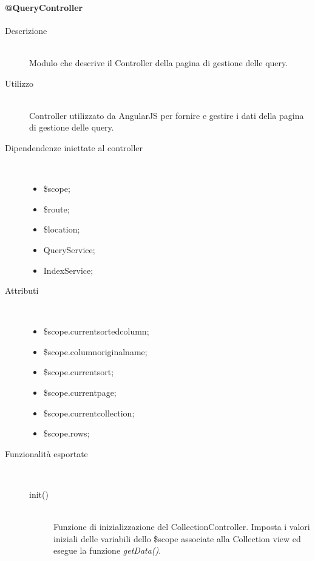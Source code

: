 \paragraph{@QueryController}
\begin{description}
 \item[Descrizione] \hfill \\
 Modulo che descrive il Controller della pagina di gestione delle query.
 
 \item[Utilizzo] \hfill \\
 Controller utilizzato da AngularJS per fornire e gestire i dati della pagina di gestione delle query.
 
 
 \item[Dipendendenze iniettate al controller] \hfill \\
 \begin{itemize}
  \item \$scope;
  \item \$route;
  \item \$location;
  \item QueryService;
  \item IndexService;
 \end{itemize}
 
 \item[Attributi] \hfill \\
 \begin{itemize}
 \item \$scope.current\textunderscore sorted\textunderscore column;
 \item \$scope.column\textunderscore original\textunderscore name;
 \item \$scope.current\textunderscore sort;
 \item \$scope.current\textunderscore page;
 \item \$scope.current\textunderscore collection;
 \item \$scope.rows;
 \end{itemize}
 
 \item[Funzionalità esportate] \hfill \\
 \begin{description}
  \item[init()] \hfill \\
  Funzione di inizializzazione del CollectionController. Imposta i valori iniziali delle variabili dello
  \$scope associate alla Collection view ed esegue la funzione \emph{getData()}.
  

\end{description}
\end{description}
